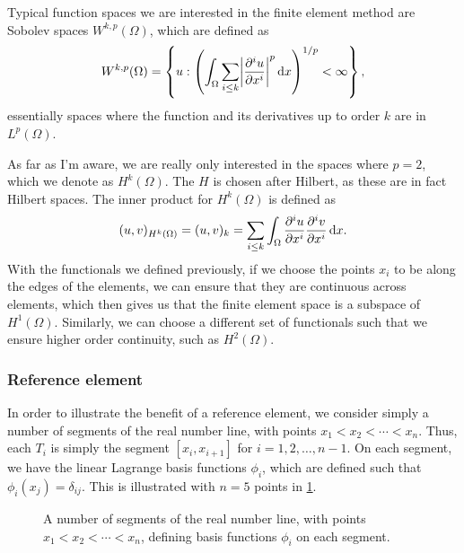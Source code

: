 Typical function spaces we are interested in the finite element method are Sobolev spaces $W^{k,p}(\Omega)$, which are defined as
\begin{equation}
    W^{k,p}(\Omega) =
    \left\{
        u :
        \left(
            \int_{\Omega}
            \sum_{i \leq k} \abs*{\frac{\partial^i u}{\partial x^i}}^p
            \diff x
        \right)^{1/p} < \infty
    \right\},
\end{equation}
essentially spaces where the function and its derivatives up to order $k$ are in $L^p(\Omega)$.

As far as I'm aware, we are really only interested in the spaces where $p = 2$, which we denote as $H^k(\Omega)$.
The $H$ is chosen after Hilbert, as these are in fact Hilbert spaces.
The inner product for $H^k(\Omega)$ is defined as
\begin{equation}
    (u, v)_{H^k(\Omega)}
    = (u, v)_k
    = \sum_{i \leq k} \int_{\Omega} \frac{\partial^i u}{\partial x^i} \frac{\partial^i v}{\partial x^i} \mathop{}\!\mathrm{d} x.
\end{equation}
With the functionals we defined previously, if we choose the points $x_i$ to be along the edges of the elements, we can ensure that they are continuous across elements, which then gives us that the finite element space is a subspace of $H^1(\Omega)$.
Similarly, we can choose a different set of functionals such that we ensure higher order continuity, such as $H^2(\Omega)$.

\subsubsection{Reference element}
In order to illustrate the benefit of a reference element, we consider simply a number of segments of the real number line, with points $x_1 < x_2 < \cdots < x_n$.
Thus, each $T_i$ is simply the segment $[x_i, x_{i+1}]$ for $i = 1, 2, \ldots, n-1$.
On each segment, we have the linear Lagrange basis functions $\phi_i$, which are defined such that $\phi_i(x_j) = \delta_{ij}$.
This is illustrated with $n = 5$ points in \cref{fig:segments}.

\begin{figure}[htbp]
    \centering
    \caption{A number of segments of the real number line, with points $x_1 < x_2 < \cdots < x_n$, defining basis functions $\phi_i$ on each segment.\label{fig:segments}}
\end{figure}

